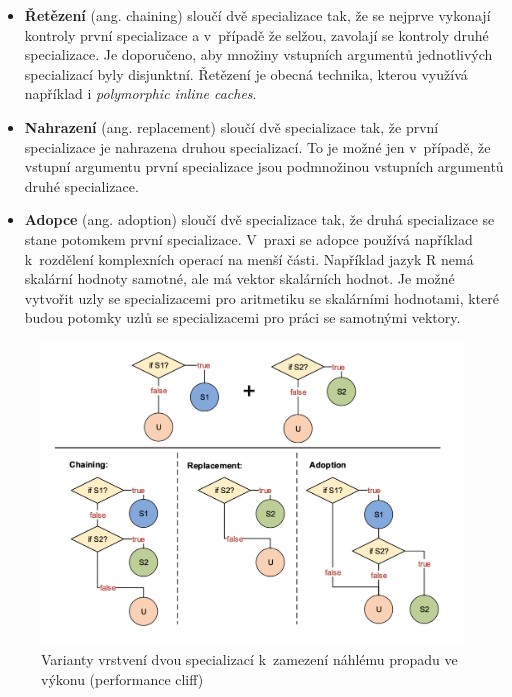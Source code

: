 \documentclass[
  master,
  biblatex,
  figures=true,
  theorems,
  sourcecodes,
  glossaries,
  index
]{kidiplom}
\begin{document}
\begin{itemize}
    \item \textbf{Řetězení} (ang. chaining) sloučí dvě specializace tak, že se nejprve vykonají kontroly první specializace a v~případě že selžou, zavolají se kontroly druhé specializace. Je doporučeno, aby množiny vstupních argumentů jednotlivých specializací byly disjunktní. Řetězení je obecná technika, kterou využívá například i \textit{polymorphic inline caches}.
    \item \textbf{Nahrazení} (ang. replacement) sloučí dvě specializace tak, že první specializace je nahrazena druhou specializací. To je možné jen v~případě, že vstupní argumentu první specializace jsou podmnožinou vstupních argumentů druhé specializace. 
    \item \textbf{Adopce} (ang. adoption) sloučí dvě specializace tak, že druhá specializace se stane potomkem první specializace. V~praxi se adopce používá například k~rozdělení komplexních operací na menší části. Například jazyk R nemá skalární hodnoty samotné, ale má vektor skalárních hodnot. Je možné vytvořit uzly se specializacemi pro aritmetiku se skalárními hodnotami, které budou potomky uzlů se specializacemi pro práci se samotnými vektory.  
\end{itemize}



\begin{figure}
    \centering
    \includegraphics[width= 1\textwidth]{images/combining-techniques2.png}
    \caption{Varianty vrstvení dvou specializací k~zamezení náhlému propadu ve výkonu (performance cliff) \cite{truffle-dsl-thesis}}
    \label{fig:chaining-replacement-adoption}
\end{figure}
\end{document}

